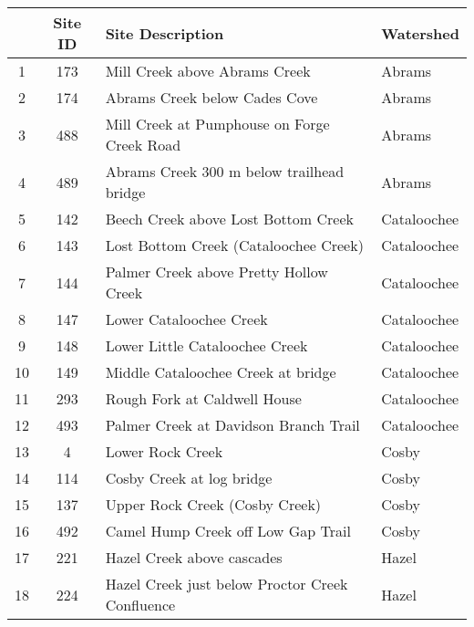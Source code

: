\begin{table}[h]\footnotesize
\begin{flushleft}
\begin{tabular}{ccll}
\toprule
      & Site ID & Site Description                                                   &Watershed\\ 
\midrule
1   & 173       & Mill Creek above Abrams Creek                             & Abrams\\
2   & 174       & Abrams Creek below Cades Cove                         & Abrams \\ 
3   & 488       & Mill Creek at Pumphouse on Forge Creek Road     & Abrams \\ 
4   & 489       & Abrams Creek 300 m below trailhead bridge         & Abrams \\ 
5   & 142       & Beech Creek above Lost Bottom Creek                 & Cataloochee \\ 
6   & 143       & Lost Bottom Creek (Cataloochee Creek)               & Cataloochee \\ 
7   & 144       & Palmer Creek above Pretty Hollow Creek              & Cataloochee \\ 
8   & 147       & Lower Cataloochee Creek                                      & Cataloochee \\ 
9   & 148       & Lower Little Cataloochee Creek                             & Cataloochee \\ 
10 & 149       & Middle Cataloochee Creek at bridge                      & Cataloochee \\ 
11 & 293       & Rough Fork at Caldwell House                               & Cataloochee \\ 
12 & 493       & Palmer Creek at Davidson Branch Trail                  & Cataloochee \\ 
13 & 4           & Lower Rock Creek                                                  & Cosby \\ 
14 & 114       & Cosby Creek at log bridge                                     & Cosby \\ 
15 & 137       & Upper Rock Creek (Cosby Creek)                          & Cosby \\ 
16 & 492       & Camel Hump Creek off Low Gap Trail                     & Cosby \\ 
17 & 221       & Hazel Creek above cascades                                 & Hazel \\ 
18 & 224       & Hazel Creek just below Proctor Creek Confluence & Hazel \\ 

\end{tabular}
\end{flushleft}
\end{table}
